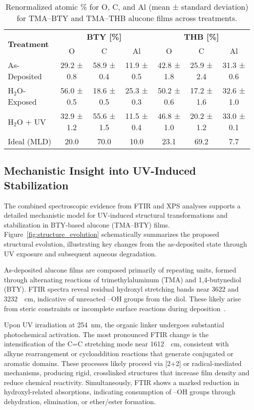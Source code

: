 \begin{table}[H]
\centering
\caption{Renormalized atomic \% for O, C, and Al (mean ± standard deviation) for TMA–BTY and TMA–THB alucone films across treatments.}
\label{tab:xps-bty-thb-corrected-final}
\begin{tabular}{l c c c c c c}
\toprule
\multirow{2}{*}{\textbf{Treatment}} & \multicolumn{3}{c}{\textbf{BTY [\%]}} & \multicolumn{3}{c}{\textbf{THB [\%]}} \\
\cmidrule(lr){2-4}\cmidrule(lr){5-7}
 & O & C & Al & O & C & Al \\
\midrule
As-Deposited & 29.2 ± 0.8 & 58.9 ± 0.4 & 11.9 ± 0.5 & 42.8 ± 1.8 & 25.9 ± 2.4 & 31.3 ± 0.6 \\
H$_2$O-Exposed & 56.0 ± 0.5 & 18.6 ± 0.5 & 25.3 ± 0.3 & 50.2 ± 0.6 & 17.2 ± 1.6 & 32.6 ± 1.0 \\
H$_2$O + UV & 32.9 ± 1.2 & 55.6 ± 1.5 & 11.5 ± 0.4 & 46.8 ± 1.0 & 20.2 ± 1.2 & 33.0 ± 0.1 \\
\midrule
Ideal (MLD) & 20.0 & 70.0 & 10.0 & 23.1 & 69.2 & 7.7 \\
\bottomrule
\end{tabular}
\end{table}

\subsection{Mechanistic Insight into UV-Induced Stabilization}

The combined spectroscopic evidence from FTIR and XPS analyses supports a detailed mechanistic model for UV-induced structural transformations and stabilization in BTY-based alucone (TMA–BTY) films. Figure~\ref{fig:structure_evolution} schematically summarizes the proposed structural evolution, illustrating key changes from the as-deposited state through UV exposure and subsequent aqueous degradation.

As-deposited alucone films are composed primarily of repeating  units, formed through alternating reactions of trimethylaluminum (TMA) and 1,4-butynediol (BTY). FTIR spectra reveal residual hydroxyl stretching bands near 3622 and 3232~\si{\per\centi\meter}, indicative of unreacted –OH groups from the diol. These likely arise from steric constraints or incomplete surface reactions during deposition~\cite{REF}.

Upon UV irradiation at \SI{254}{\nano\meter}, the organic linker undergoes substantial photochemical activation. The most pronounced FTIR change is the intensification of the C=C stretching mode near \SI{1612}{\per\centi\meter}, consistent with alkyne rearrangement or cycloaddition reactions that generate conjugated or aromatic domains. These processes likely proceed via [2+2] or radical-mediated mechanisms, producing rigid, crosslinked structures that increase film density and reduce chemical reactivity. Simultaneously, FTIR shows a marked reduction in hydroxyl-related absorptions, indicating consumption of –OH groups through dehydration, elimination, or ether/ester formation.


